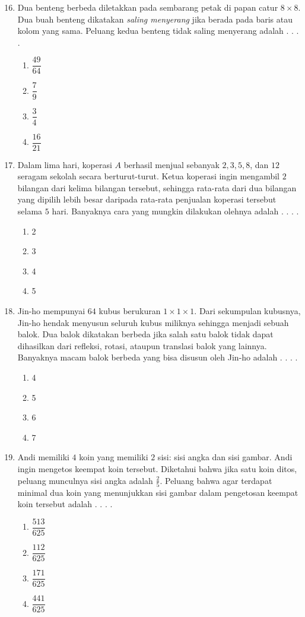 \documentclass{article}
\begin{document}
\begin{enumerate}[label={Soal \arabic*}]
    \setcounter{enumi}{15}
    \item Dua benteng berbeda diletakkan pada sembarang petak di papan catur $8\times 8$. Dua buah benteng dikatakan \textit{saling menyerang} jika berada pada baris atau kolom yang sama. Peluang kedua benteng tidak saling menyerang adalah . . . .
    \begin{enumerate}[label={(\Alph*)}]
        \item $\dfrac{49}{64}$ \item $\dfrac{7}{9}$ \item $\dfrac{3}{4}$ \item $\dfrac{16}{21}$
    \end{enumerate}

    \item Dalam lima hari, koperasi $A$ berhasil menjual sebanyak $2,3,5,8$, dan $12$ seragam sekolah secara berturut-turut. Ketua koperasi ingin mengambil $2$ bilangan dari kelima bilangan tersebut, sehingga rata-rata dari dua bilangan yang dipilih lebih besar daripada rata-rata penjualan koperasi tersebut selama $5$ hari. Banyaknya cara yang mungkin dilakukan olehnya adalah . . . .
    \begin{enumerate}[label={(\Alph*)}]
        \item 2 \item 3 \item 4 \item 5
    \end{enumerate}

    \item Jin-ho mempunyai $64$ kubus berukuran $1\times 1\times 1$. Dari sekumpulan kubusnya, Jin-ho hendak menyusun seluruh kubus miliknya sehingga menjadi sebuah balok. Dua balok dikatakan berbeda jika salah satu balok tidak dapat dihasilkan dari refleksi, rotasi, ataupun translasi balok yang lainnya. Banyaknya macam balok berbeda yang bisa disusun oleh Jin-ho adalah . . . .
    \begin{enumerate}[label={(\Alph*)}]
        \item 4 \item 5 \item 6 \item 7
    \end{enumerate}

    \item Andi memiliki $4$ koin yang memiliki $2$ sisi: sisi angka dan sisi gambar. Andi ingin mengetos keempat koin tersebut. Diketahui bahwa jika satu koin ditos, peluang munculnya sisi angka adalah $\frac{2}{5}$. Peluang bahwa agar terdapat minimal dua koin yang menunjukkan sisi gambar dalam pengetosan keempat koin tersebut adalah . . . .
    \begin{enumerate}[label={(\Alph*)}]
        \item $\dfrac{513}{625}$ \item $\dfrac{112}{625}$ \item $\dfrac{171}{625}$ \item $\dfrac{441}{625}$
    \end{enumerate}


\end{enumerate}
\end{document}
